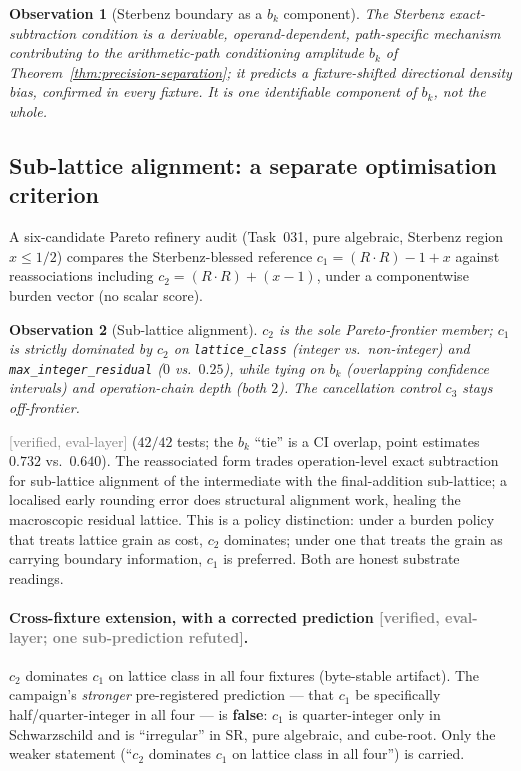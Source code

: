 \documentclass[11pt,a4paper]{article}
\newtheorem{observation}{Observation}
\newcommand{\status}[1]{\textcolor{gray}{\small\textsf{[#1]}}}
\begin{document}
\begin{observation}[Sterbenz boundary as a $b_k$ component]\label{obs:sterbenz}
The Sterbenz exact-subtraction condition is a derivable, operand-dependent, path-specific mechanism contributing to the arithmetic-path conditioning amplitude $b_k$ of Theorem~\ref{thm:precision-separation}; it predicts a fixture-shifted directional density bias, confirmed in every fixture. It is one identifiable component of $b_k$, not the whole.
\end{observation}

\subsection{Sub-lattice alignment: a separate optimisation criterion}\label{sec:refinery}

A six-candidate Pareto refinery audit (Task~031, pure algebraic, Sterbenz region $x\le1/2$) compares the Sterbenz-blessed reference $c_1=(R\cdot R)-1+x$ against reassociations including $c_2=(R\cdot R)+(x-1)$, under a componentwise burden vector (no scalar score).

\begin{observation}[Sub-lattice alignment]\label{obs:sublattice}
$c_2$ is the sole Pareto-frontier member; $c_1$ is strictly dominated by $c_2$ on \texttt{lattice\_class} (integer vs.\ non-integer) and \texttt{max\_integer\_residual} ($0$ vs.\ $0.25$), while tying on $b_k$ (overlapping confidence intervals) and operation-chain depth (both $2$). The cancellation control $c_3$ stays off-frontier.
\end{observation}
\status{verified, eval-layer} ($42/42$ tests; the $b_k$ ``tie'' is a CI overlap, point estimates $0.732$ vs.\ $0.640$). The reassociated form trades operation-level exact subtraction for sub-lattice alignment of the intermediate with the final-addition sub-lattice; a localised early rounding error does structural alignment work, healing the macroscopic residual lattice. This is a policy distinction: under a burden policy that treats lattice grain as cost, $c_2$ dominates; under one that treats the grain as carrying boundary information, $c_1$ is preferred. Both are honest substrate readings.

\paragraph{Cross-fixture extension, with a corrected prediction \status{verified, eval-layer; one sub-prediction refuted}.} $c_2$ dominates $c_1$ on lattice class in all four fixtures (byte-stable artifact). The campaign's \emph{stronger} pre-registered prediction --- that $c_1$ be specifically half/quarter-integer in all four --- is \textbf{false}: $c_1$ is quarter-integer only in Schwarzschild and is ``irregular'' in SR, pure algebraic, and cube-root. Only the weaker statement (``$c_2$ dominates $c_1$ on lattice class in all four'') is carried.
\end{document}
